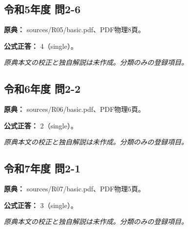\subsection{令和5年度 問2-6}
\label{q:r05-reg-basic-2-6}

\noindent\textbf{原典：} sources/R05/basic.pdf、PDF物理8頁。

\textbf{公式正答：} 4（single）。

\par\textit{原典本文の校正と独自解説は未作成。分類のみの登録項目。}

\subsection{令和6年度 問2-2}
\label{q:r06-reg-basic-2-2}

\noindent\textbf{原典：} sources/R06/basic.pdf、PDF物理6頁。

\textbf{公式正答：} 2（single）。

\par\textit{原典本文の校正と独自解説は未作成。分類のみの登録項目。}

\subsection{令和7年度 問2-1}
\label{q:r07-reg-basic-2-1}

\noindent\textbf{原典：} sources/R07/basic.pdf、PDF物理5頁。

\textbf{公式正答：} 3（single）。

\par\textit{原典本文の校正と独自解説は未作成。分類のみの登録項目。}
